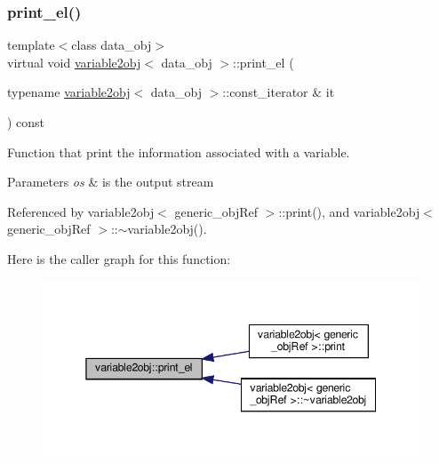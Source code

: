 \subsubsection{\texorpdfstring{print\+\_\+el()}{print\_el()}}
{\footnotesize\ttfamily template$<$class data\+\_\+obj$>$ \\
virtual void \hyperlink{structvariable2obj}{variable2obj}$<$ data\+\_\+obj $>$\+::print\+\_\+el (\begin{DoxyParamCaption}\item[{typename \hyperlink{structvariable2obj}{variable2obj}$<$ data\+\_\+obj $>$\+::const\+\_\+iterator \&}]{it }\end{DoxyParamCaption}) const\hspace{0.3cm}{\ttfamily [pure virtual]}}



Function that print the information associated with a variable. 


\begin{DoxyParams}{Parameters}
{\em os} & is the output stream \\
\hline
\end{DoxyParams}


Referenced by variable2obj$<$ generic\+\_\+obj\+Ref $>$\+::print(), and variable2obj$<$ generic\+\_\+obj\+Ref $>$\+::$\sim$variable2obj().

Here is the caller graph for this function\+:
\nopagebreak
\begin{figure}[H]
\begin{center}
\leavevmode
\includegraphics[width=345pt]{d9/d92/structvariable2obj_a951c49f2d2a83790b32830b9f7fd1d30_icgraph}
\end{center}
\end{figure}
\mbox{\label{structvariable2obj_a74c24f89e8a9a27dded758a415d90a96}} 
